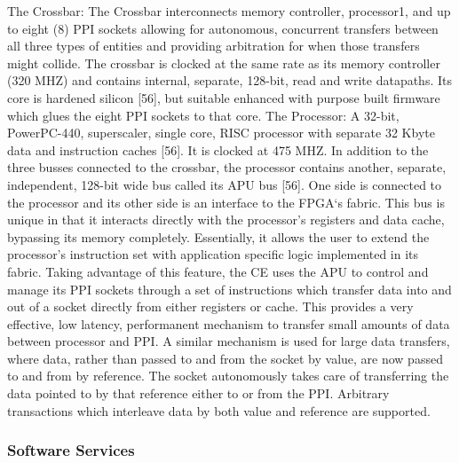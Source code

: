 The Crossbar: The Crossbar interconnects memory controller, processor1, and up to eight (8) PPI sockets allowing for autonomous, concurrent transfers between all three types of entities and providing arbitration for when those transfers might collide. The crossbar is clocked at the same rate as its memory controller (320 MHZ) and contains internal, separate, 128-bit, read and write datapaths. Its core is hardened silicon [56], but suitable enhanced with purpose built firmware which glues the eight PPI sockets to that core.
The Processor: A 32-bit, PowerPC-440, superscaler, single core, RISC processor with separate 32 Kbyte data and instruction caches [56]. It is clocked at 475 MHZ. In addition to the three busses connected to the crossbar, the processor contains another, separate, independent, 128-bit wide bus called its APU bus [56]. One side is connected to the processor and its other side is an interface to the FPGA‘s fabric. This bus is unique in that it interacts directly with the processor's registers and data cache, bypassing its memory completely. Essentially, it allows the user to extend the processor's instruction set with application specific logic implemented in its fabric. Taking advantage of this feature, the CE uses the APU to control and manage its PPI sockets through a set of instructions which transfer data into and out of a socket directly from either registers or cache. This provides a very effective, low latency, performanent mechanism to transfer small amounts of data between processor and PPI. A similar mechanism is used for large data transfers, where data, rather than passed to and from the socket by value, are now passed to and from by reference. The socket autonomously takes care of transferring the data pointed to by that reference either to or from the PPI. Arbitrary transactions which interleave data by both value and reference are supported.

\subsubsection{Software Services}

